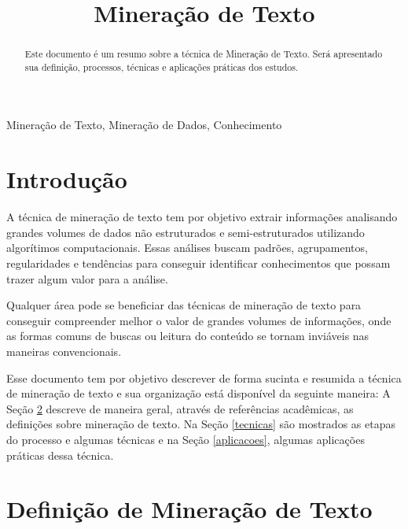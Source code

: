 \documentclass[conference]{IEEEtran}
\begin{document}
\title{Mineração de Texto}

\author{
}

\maketitle

\begin{abstract}
Este documento é um resumo sobre a técnica de Mineração de Texto. Será apresentado sua definição, processos, técnicas e aplicações práticas dos estudos.
\end{abstract}

\begin{IEEEkeywords}
Mineração de Texto, Mineração de Dados, Conhecimento
\end{IEEEkeywords}

\section{Introdução}
A técnica de mineração de texto tem por objetivo extrair informações  analisando grandes volumes de dados não estruturados e semi-estruturados utilizando algorítimos computacionais. Essas análises buscam padrões, agrupamentos, regularidades e tendências para conseguir identificar conhecimentos que possam trazer algum  valor para a análise.

Qualquer área pode se beneficiar das técnicas de mineração de texto para conseguir compreender melhor o valor de grandes volumes de informações, onde as formas comuns de buscas ou leitura do conteúdo se tornam inviáveis nas maneiras convencionais.

Esse documento tem por objetivo descrever de forma sucinta e resumida a técnica de mineração de texto e sua organização está disponível da seguinte maneira: A Seção \ref{definicao} descreve de maneira geral, através de referências acadêmicas, as definições sobre mineração de texto. Na Seção \ref{tecnicas} são mostrados as etapas do processo e algumas técnicas e na Seção \ref{aplicacoes}, algumas aplicações práticas dessa técnica.

\section{Definição de Mineração de Texto}\label{definicao}
\end{document}
